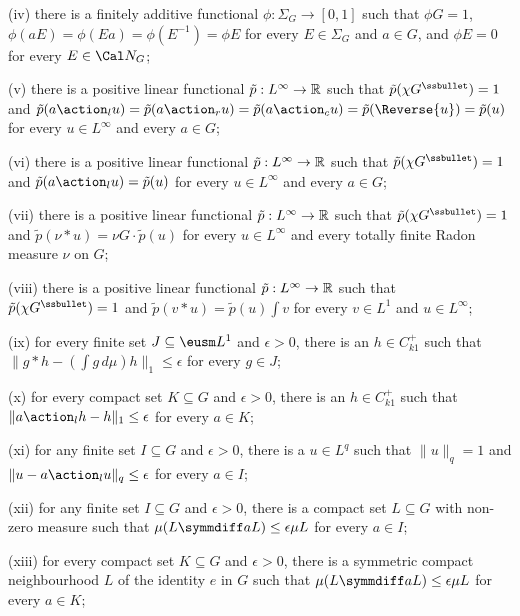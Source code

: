 (iv)
there is a finitely additive functional $\phi:\Sigma_G\to[0,1]$ such that
$\phi G=1$, $\phi(aE)=\phi(Ea)=\phi(E^{-1})=\phi E$ for every
$E\in\Sigma_G$ and $a\in G$, and $\phi E=0$ for every $E\in\Cal N_G$;

(v) there is a positive
linear functional $\tilde p:L^{\infty}\to\Bbb R$ such that
$\tilde p(\chi G^{\ssbullet})=1$ and
$\tilde p(a\action_lu)=\tilde p(a\action_ru)=\tilde p(a\action_cu)
=\tilde p(\Reverse{u})=\tilde p(u)$ for
every $u\in L^{\infty}$ and every $a\in G$;

(vi) there is a positive
linear functional $\tilde p:L^{\infty}\to\Bbb R$ such that
$\tilde p(\chi G^{\ssbullet})=1$ and
$\tilde p(a\action_lu)=\tilde p(u)$ for
every $u\in L^{\infty}$ and every $a\in G$;

(vii) there is a positive
linear functional $\tilde p:L^{\infty}\to\Bbb R$ such that
$\tilde p(\chi G^{\ssbullet})=1$ and
$\tilde p(\nu*u)=\nu G\cdot\tilde p(u)$ for
every $u\in L^{\infty}$ and every totally finite Radon measure
$\nu$ on $G$;

(viii) there is a positive linear functional
$\tilde p:L^{\infty}\to\Bbb R$ such that
$\tilde p(\chi G^{\ssbullet})=1$ and
$\tilde p(v*u)=\tilde p(u)\int v$ for
every $v\in L^1$ and $u\in L^{\infty}$;

(ix) for every finite set $J\subseteq\eusm L^1$ and
$\epsilon>0$, there is an $h\in C_{k1}^+$ such that
$\|g*h-(\int g\,d\mu)h\|_1\le\epsilon$ for every $g\in J$;

(x) for every compact set $K\subseteq G$ and $\epsilon>0$, there is
an $h\in C_{k1}^+$ such that $\|a\action_lh-h\|_1\le\epsilon$ for
every $a\in K$;

(xi)
for any finite set $I\subseteq G$ and $\epsilon>0$, there is a
$u\in L^q$ such that $\|u\|_q=1$ and $\|u-a\action_lu\|_q\le\epsilon$
for every $a\in I$;

(xii)
for any finite set $I\subseteq G$ and $\epsilon>0$, there is a
compact set $L\subseteq G$ with non-zero measure such that
$\mu(L\symmdiff aL)\le\epsilon\mu L$ for every $a\in I$;

(xiii)
for every compact set $K\subseteq G$ and $\epsilon>0$, there is a
symmetric compact neighbourhood $L$ of the identity $e$ in $G$
such that $\mu(L\symmdiff aL)\le\epsilon\mu L$ for every $a\in K$;

